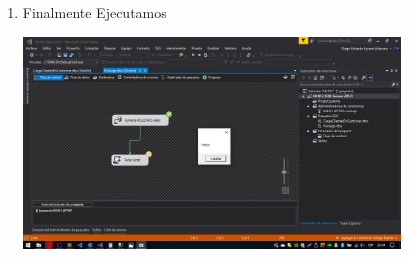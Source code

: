 \begin{enumerate}
    \item Finalmente Ejecutamos
     \begin{center}
            \includegraphics[width=10cm]{imagenes/registros_final.jpg}
        \end{center}
\end{enumerate}